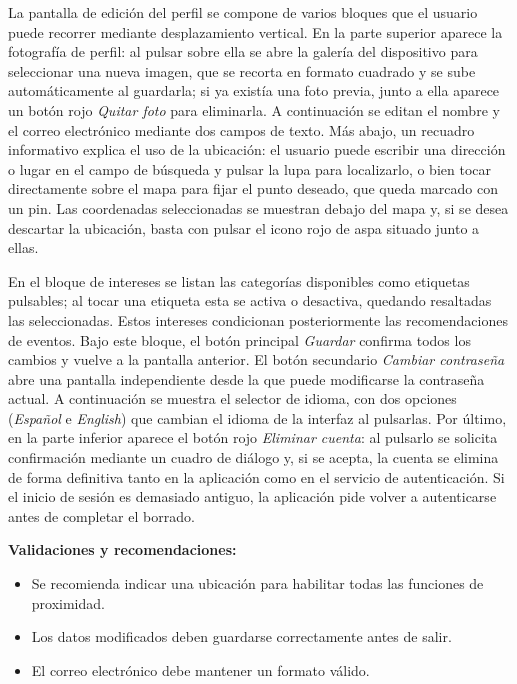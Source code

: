 La pantalla de edición del perfil se compone de varios bloques que el usuario puede recorrer mediante desplazamiento vertical. En la parte superior aparece la fotografía de perfil: al pulsar sobre ella se abre la galería del dispositivo para seleccionar una nueva imagen, que se recorta en formato cuadrado y se sube automáticamente al guardarla; si ya existía una foto previa, junto a ella aparece un botón rojo \textit{Quitar foto} para eliminarla. A continuación se editan el nombre y el correo electrónico mediante dos campos de texto. Más abajo, un recuadro informativo explica el uso de la ubicación: el usuario puede escribir una dirección o lugar en el campo de búsqueda y pulsar la lupa para localizarlo, o bien tocar directamente sobre el mapa para fijar el punto deseado, que queda marcado con un pin. Las coordenadas seleccionadas se muestran debajo del mapa y, si se desea descartar la ubicación, basta con pulsar el icono rojo de aspa situado junto a ellas.

En el bloque de intereses se listan las categorías disponibles como etiquetas pulsables; al tocar una etiqueta esta se activa o desactiva, quedando resaltadas las seleccionadas. Estos intereses condicionan posteriormente las recomendaciones de eventos. Bajo este bloque, el botón principal \textit{Guardar} confirma todos los cambios y vuelve a la pantalla anterior. El botón secundario \textit{Cambiar contraseña} abre una pantalla independiente desde la que puede modificarse la contraseña actual. A continuación se muestra el selector de idioma, con dos opciones (\textit{Español} e \textit{English}) que cambian el idioma de la interfaz al pulsarlas. Por último, en la parte inferior aparece el botón rojo \textit{Eliminar cuenta}: al pulsarlo se solicita confirmación mediante un cuadro de diálogo y, si se acepta, la cuenta se elimina de forma definitiva tanto en la aplicación como en el servicio de autenticación. Si el inicio de sesión es demasiado antiguo, la aplicación pide volver a autenticarse antes de completar el borrado.

\bigskip

\textbf{Validaciones y recomendaciones:}
\begin{itemize}[leftmargin=1.5em]
\item Se recomienda indicar una ubicación para habilitar todas las funciones de proximidad.
\item Los datos modificados deben guardarse correctamente antes de salir.
\item El correo electrónico debe mantener un formato válido.
\end{itemize}


